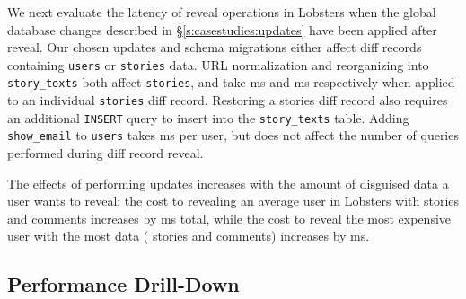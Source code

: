 %
We next evaluate the latency of reveal operations in Lobsters when the global
database changes described in \S\ref{s:casestudies:updates} have been applied
after reveal.
%
Our chosen updates and schema migrations either affect diff records containing 
\texttt{users} or \texttt{stories} data. URL normalization and reorganizing into
\texttt{story\_texts} both affect \texttt{stories}, and take ms and
ms respectively when applied to an individual \texttt{stories} diff
record.
%
Restoring a stories diff record also requires an additional \texttt{INSERT}
query to insert into the \texttt{story\_texts} table.
%
Adding \texttt{show\_email} to \texttt{users} takes ms per user, but
does not affect the number of queries performed during diff record reveal.
%

%
The effects of performing updates increases with the amount of disguised data
a user wants to reveal; the cost to revealing an average user in Lobsters with 
stories and  comments increases by ms total, while the cost
to reveal the most expensive user with the most data ( stories and
 comments) increases by ms.


\subsection{\sys Performance Drill-Down}
\label{s:eval-additional}


